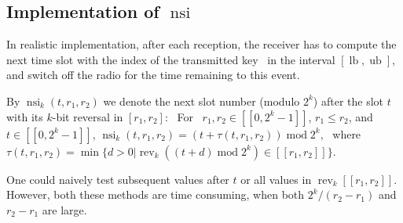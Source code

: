 \documentclass{article}
\newcommand{\tmop}[1]{\ensuremath{\operatorname{#1}}}
\begin{document}
\subsection{\label{Section-nsi}Implementation of $\tmop{nsi}$}

In realistic implementation, after each reception, the receiver has to compute
the next time slot with the index of the transmitted key \ in the interval
$[\tmop{lb}, \tmop{ub}]$, and switch off the radio for the time remaining to
this event.

By $\tmop{nsi}_k (t, r_1, r_2)$ we denote the next slot number (modulo $2^k$)
after the slot $t$ with its $k$-bit reversal in $[r_1, r_2]$: \ For \ $r_1,
r_2 \in [[0, 2^k - 1]]$, $r_1 \leq r_2$, and $t \in [[0, 2^k - 1]]$,
$\tmop{nsi}_k (t, r_1, r_2) = (t + \tau (t, r_1, r_2)) \tmop{mod} 2^k$, \
where $\tau (t, r_1, r_2) = \min \{d > 0 | \tmop{rev}_k ((t + d) \tmop{mod}
2^k) \in [[r_1, r_2]]\}$.

One could naively test subsequent values after $t$ or all values in
$\tmop{rev}_k [[r_1, r_2]]$. However, both these methods are time consuming,
when both $2^k / (r_2 - r_1)$ and $r_2 - r_1$ are large.
\end{document}
